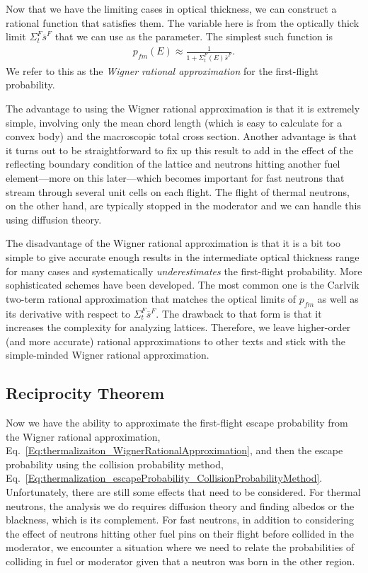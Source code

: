 Now that we have the limiting cases in optical thickness, we can construct a rational function that satisfies them. The variable here is from the optically thick limit $\Sigma_t^F \overline{s}^F$ that we can use as the parameter. The simplest such function is
\begin{align}
  p_{fm}(E) \approx \frac{1}{1 + \Sigma_t^F(E) \overline{s}^F } . \label{Eq:thermalizaiton_WignerRationalApproximation}
\end{align}
We refer to this as the \emph{Wigner rational approximation} for the first-flight probability. 

The advantage to using the Wigner rational approximation is that it is extremely simple, involving only the mean chord length (which is easy to calculate for a convex body) and the macroscopic total cross section. Another advantage is that it turns out to be straightforward to fix up this result to add in the effect of the reflecting boundary condition of the lattice and neutrons hitting another fuel element---more on this later---which becomes important for fast neutrons that stream through several unit cells on each flight. The flight of thermal neutrons, on the other hand, are typically stopped in the moderator and we can handle this using diffusion theory.

The disadvantage of the Wigner rational approximation is that it is a bit too simple to give accurate enough results in the intermediate optical thickness range for many cases and systematically \emph{underestimates} the first-flight probability. More sophisticated schemes have been developed. The most common one is the Carlvik two-term rational approximation that matches the optical limits of $p_{fm}$ as well as its derivative with respect to $\Sigma_t^F \overline{s}^F$. The drawback to that form is that it increases the complexity for analyzing lattices. Therefore, we leave higher-order (and more accurate) rational approximations to other texts and stick with the simple-minded Wigner rational approximation.

\subsection{Reciprocity Theorem}

Now we have the ability to approximate the first-flight escape probability from the Wigner rational approximation, Eq.~\eqref{Eq:thermalizaiton_WignerRationalApproximation}, and then the escape probability using the collision probability method, Eq.~\eqref{Eq:thermalization_escapeProbability_CollisionProbabilityMethod}. Unfortunately, there are still some effects that need to be considered. For thermal neutrons, the analysis we do requires diffusion theory and finding albedos or the blackness, which is its complement. For fast neutrons, in addition to considering the effect of neutrons hitting other fuel pins on their flight before collided in the moderator, we encounter a situation where we need to relate the probabilities of colliding in fuel or moderator given that a neutron was born in the other region.

